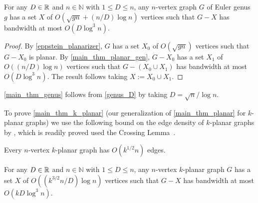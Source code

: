 \documentclass{patmorin}
\renewcommand{\leq}{\leqslant}
\newcommand{\david}[1]{{\color{orange} David: #1}}
\newcommand{\pat}[1]{\textcolor{Blue}{Pat: #1}}
\newcommand{\NN}{\mathbb{N}}
\begin{document}
\begin{lem}
\label{genus_D}
For any $D\in\mathbb{R}$ and $n\in\NN$ with $1\leq D\leq n$, any $n$-vertex graph $G$ of Euler genus $g$ has a set $X$ of $O(\sqrt{gn}+(n/D) \log n)$ vertices such that $G-X$ has bandwidth at most $O(D\log^3 n)$.
\end{lem}

\begin{proof}
By \cref{eppstein_planarizer}, $G$ has a set $X_0$ of $O(\sqrt{gn})$ vertices such that $G-X_0$ is planar.  By \cref{main_thm_planar_gen}, $G-X_0$ has a set $X_1$ of $O((n/D)\log n)$ vertices such that $G-(X_0\cup X_1)$ has bandwidth at most $O(D\log^3 n)$. The result follows taking $X:=X_0\cup X_1$.
\end{proof}

\cref{main_thm_genus} follows from \cref{genus_D} by taking $D=\sqrt{n}/\log n$.


To prove \cref{main_thm_k_planar} (our generalization of \cref{main_thm_planar} for $k$-planar graphs) we use the following bound on the edge density of $k$-planar graphs by \citet{PachToth97}, which is readily proved used the Crossing Lemma~\cite{ajtai.chvatal.ea:crossing_free}.



\begin{lem}
\label{k_planar_density}
Every $n$-vertex $k$-planar graph has $O(k^{1/2} n)$ edges.
\end{lem}



\begin{lem}\label{k_planar_D}
For any $D\in\mathbb{R}$ and $n\in\NN$ with $1\leq D\leq n$, any $n$-vertex $k$-planar graph $G$ has a set $X$ of $O((k^{3/2}n/D) \log n)$ vertices such that $G-X$ has bandwidth at most $O(kD\log^3 n)$.
\end{lem}
\end{document}
